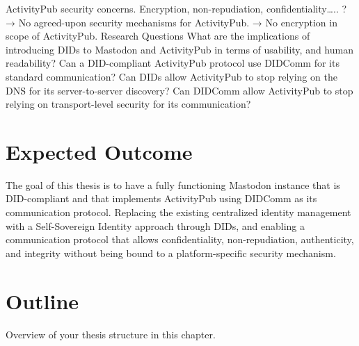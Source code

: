ActivityPub security concerns. Encryption, non-repudiation, confidentiality….. ? 
→ No agreed-upon security mechanisms for ActivityPub. 
→ No encryption in scope of ActivityPub.
Research Questions
What are the implications of introducing DIDs to Mastodon and ActivityPub in terms of usability, and human readability?
Can a DID-compliant ActivityPub protocol use DIDComm for its standard communication?
Can DIDs allow ActivityPub to stop relying on the DNS for its server-to-server discovery?
Can DIDComm allow ActivityPub to stop relying on transport-level security for its communication?

\section{Expected Outcome}
The goal of this thesis is to have a fully functioning Mastodon instance that is DID-compliant and that implements ActivityPub using DIDComm as its communication protocol. 
Replacing the existing centralized identity management with a Self-Sovereign Identity approach through DIDs, and enabling a communication protocol that allows confidentiality, non-repudiation, authenticity, and integrity without being bound to a platform-specific security mechanism.
 
\section{Outline}
Overview of your thesis structure in this chapter.
